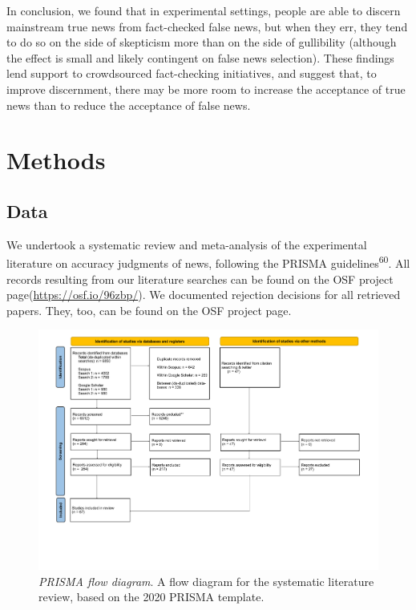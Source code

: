 \documentclass[
  man]{apa6}
\begin{document}
In conclusion, we found that in experimental settings, people are able to discern mainstream true news from fact-checked false news, but when they err, they tend to do so on the side of skepticism more than on the side of gullibility (although the effect is small and likely contingent on false news selection). These findings lend support to crowdsourced fact-checking initiatives, and suggest that, to improve discernment, there may be more room to increase the acceptance of true news than to reduce the acceptance of false news.

\section{Methods}\label{methods}

\subsection{Data}\label{data}

We undertook a systematic review and meta-analysis of the experimental literature on accuracy judgments of news, following the PRISMA guidelines\textsuperscript{60}. All records resulting from our literature searches can be found on the OSF project page(\url{https://osf.io/96zbp/}). We documented rejection decisions for all retrieved papers. They, too, can be found on the OSF project page.



\begin{figure}
\centering
\includegraphics{literature_search/PRISMA_2020_flow_diagram.pdf}
\caption{\label{fig:prisma-flowchart}\emph{PRISMA flow diagram}. A flow diagram for the systematic literature review, based on the 2020 PRISMA template.}
\end{figure}
\end{document}
